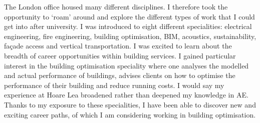 The London office housed many different disciplines.
I therefore took the opportunity to `roam' around and explore the different types of work that I could get into after university.
I was introduced to eight different specialities:
electrical engineering,
fire engineering,
building optimisation,
BIM,
acoustics,
sustainability,
façade access and
vertical transportation.
I was excited to learn about the breadth of career opportunities within building services.
I gained particular interest in the building optimisation speciality where one analyses the modelled and actual performance of buildings, advises clients on how to optimise the performance of their building and reduce running costs.
I would say my experience at Hoare Lea broadened rather than deepened my knowledge in AE.
Thanks to my exposure to these specialities, I have been able to discover new and exciting career paths, of which I am considering working in building optimisation.